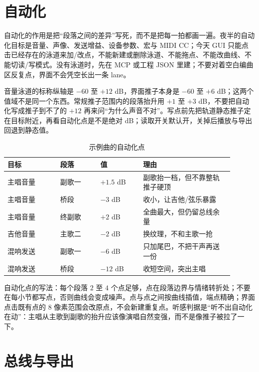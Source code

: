 \section{自动化}

自动化的作用是把“段落之间的差异”写死，而不是把每一拍都画一遍。夜半的自动化目标是音量、声像、发送增益、设备参数、宏与 MIDI CC；今天 GUI 只能点击已经存在的泳道来加/改点，不能新建或删除泳道、不能拖点、不能改曲线、不能切读/写模式。没有泳道时，先在 MCP 或工程 JSON 里建；不要对着空白编曲区反复点，界面不会凭空长出一条 lane。

音量泳道的标称纵轴是 $-60$ 至 $+12$ dB，界面推子本身是 $-60$ 至 $+6$ dB；这两个值域不是同一个东西。常规推子范围内的段落抬升用 $+1$ 至 $+3$ dB，不要把自动化写成推子到不了的 $+12$ 再来问“为什么声音不对”。写点前先把轨道静态推子定在目标附近，再看自动化点是不是绝对 dB；读取开关默认开，关掉后播放与导出回退到静态值。

\begin{table}[htbp]
\centering
\small
\begin{tabular}{@{}p{0.21\linewidth}p{0.16\linewidth}p{0.17\linewidth}p{0.36\linewidth}@{}}
\hline
目标 & 段落 & 值 & 理由 \\
\hline
主唱音量 & 副歌一 & $+1.5$ dB & 副歌抬一档，但不靠整轨推子硬顶 \\
主唱音量 & 桥段 & $-3$ dB & 收小，让吉他/弦乐暴露 \\
主唱音量 & 终副歌 & $+2$ dB & 全曲最大，但仍留总线余量 \\
吉他音量 & 主歌二 & $-2$ dB & 换纹理，不和主歌一抢 \\
混响发送 & 副歌一 & $-6$ dB & 只加尾巴，不把干声再送一份 \\
混响发送 & 桥段 & $-12$ dB & 收短空间，突出主唱 \\
\hline
\end{tabular}
\caption{示例曲的自动化点}
\label{tab:walk-automation}
\end{table}

自动化点的写法：每个段落 $2$ 至 $4$ 个点足够，点在段落边界与情绪转折处；不要在每小节都写点，否则曲线会变成噪声。点与点之间按曲线插值，端点精确；界面点击既有点的 $8$ 像素范围会改原点，不会新建重复点。听感判据是“听不出自动化在动”：主唱从主歌到副歌的抬升应该像演唱自然变强，而不是像推子被拉了一下。


\section{总线与导出}

